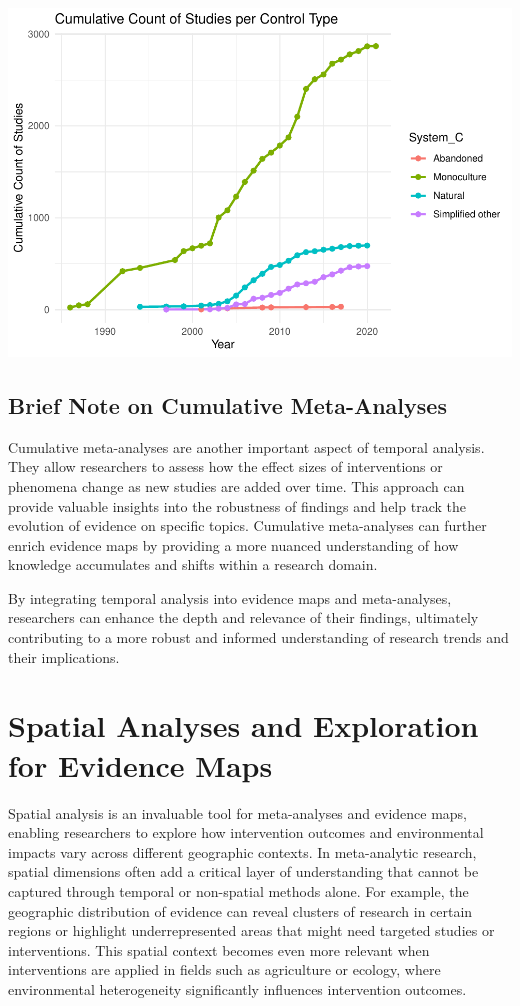 \documentclass[
]{book}
\begin{document}
\includegraphics{_main_files/figure-latex/unnamed-chunk-7-1.pdf}

\section{Brief Note on Cumulative Meta-Analyses}\label{brief-note-on-cumulative-meta-analyses}

Cumulative meta-analyses are another important aspect of temporal analysis.
They allow researchers to assess how the effect sizes of interventions or phenomena change as new studies are added over time.
This approach can provide valuable insights into the robustness of findings and help track the evolution of evidence on specific topics.
Cumulative meta-analyses can further enrich evidence maps by providing a more nuanced understanding of how knowledge accumulates and shifts within a research domain.

By integrating temporal analysis into evidence maps and meta-analyses, researchers can enhance the depth and relevance of their findings, ultimately contributing to a more robust and informed understanding of research trends and their implications.

\chapter{Spatial Analyses and Exploration for Evidence Maps}\label{spatial-analyses-and-exploration-for-evidence-maps}

Spatial analysis is an invaluable tool for meta-analyses and evidence maps, enabling researchers to explore how intervention outcomes and environmental impacts vary across different geographic contexts.
In meta-analytic research, spatial dimensions often add a critical layer of understanding that cannot be captured through temporal or non-spatial methods alone.
For example, the geographic distribution of evidence can reveal clusters of research in certain regions or highlight underrepresented areas that might need targeted studies or interventions.
This spatial context becomes even more relevant when interventions are applied in fields such as agriculture or ecology, where environmental heterogeneity significantly influences intervention outcomes.
\end{document}
